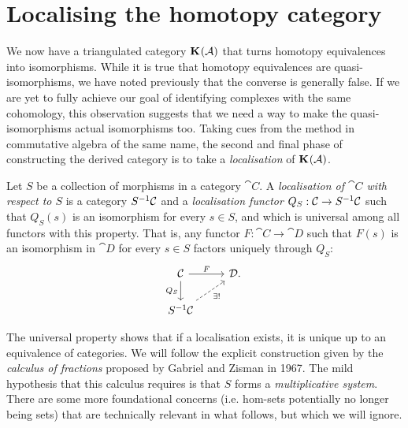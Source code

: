 \section{Localising the homotopy category}
\label{sect_localising_homcat}

We now have a triangulated category $\homcat{\abcat{A}}$ that turns
homotopy equivalences into isomorphisms.
While it is true that homotopy equivalences are quasi-isomorphisms,
we have noted previously that the converse is generally false.
If we are yet to fully achieve our goal of identifying complexes with
the same cohomology, this observation suggests that we need a way to
make the quasi-isomorphisms actual isomorphisms too.
Taking cues from the method in commutative algebra of the same name,
the second and final phase of constructing the derived category is to
take a \emph{localisation} of $\homcat{\abcat{A}}$.

\begin{definition}
  \label{def_univ_prop_of_locln}
  Let $S$ be a collection of morphisms in a category $\cat{C}$.
  A \emph{localisation of $\cat{C}$ with respect to $S$} is a
  category $\locln{\cat{C}}{S}$ and a \emph{localisation functor}
  $Q_S: \abcat{C} \to \locln{\abcat{C}}{S}$ such that $Q_S(s)$ is an
  isomorphism for every $s \in S$, and which is universal among all
  functors with this property.
  That is, any functor $F: \cat{C} \to \cat{D}$ such that $F(s)$ is
  an isomorphism in $\cat{D}$ for every $s \in S$ factors uniquely
  through $Q_S$:
  \[
    \begin{tikzcd}
      {\cat{C}} & {\cat{D}.} \\
      {\locln{\cat{C}}{S}}
      \arrow["F", from=1-1, to=1-2]
      \arrow["Q_S"', from=1-1, to=2-1]
      \arrow["\exists!"', dashed, from=2-1, to=1-2]
    \end{tikzcd}
  \]
  \vspace{-12pt}
\end{definition}

\iffalse
\begin{example}
  Because of \cref{prop_univ_prop_of_homcat},
  $\homcat{\abcat{A}}$ is in fact a localisation of $\Ch{\abcat{A}}$
  with respect to homotopy equivalences.
\end{example}
\fi

The universal property shows that if a localisation exists, it is
unique up to an equivalence of categories.
We will follow the explicit construction given by the \emph{calculus
of fractions} proposed by Gabriel and Zisman in 1967.
The mild hypothesis that this calculus requires is that $S$ forms a
\emph{multiplicative system}.
There are some more foundational concerns (i.e. hom-sets potentially
no longer being sets) that are technically relevant in what follows,
but which we will ignore.


